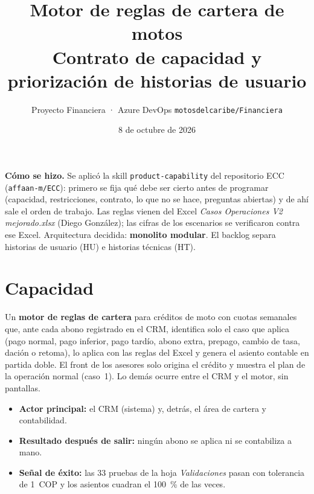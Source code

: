 \documentclass[11pt,a4paper]{article}
\title{\color{primario}\textbf{Motor de reglas de cartera de motos}\\[4pt]
\large Contrato de capacidad y priorización de historias de usuario}
\author{Proyecto Financiera · Azure DevOps \texttt{motosdelcaribe/Financiera}}
\date{8 de octubre de 2026}
\begin{document}
\maketitle
\thispagestyle{fancy}

\begin{tcolorbox}[colback=white,colframe=gris,boxrule=0.3pt,arc=2pt]
\small
\textbf{Cómo se hizo.} Se aplicó la skill \texttt{product-capability} del repositorio ECC
(\texttt{affaan-m/ECC}): primero se fija qué debe ser cierto antes de programar (capacidad,
restricciones, contrato, lo que no se hace, preguntas abiertas) y de ahí sale el orden de trabajo.
Las reglas vienen del Excel \textit{Casos Operaciones V2 mejorado.xlsx} (Diego González);
las cifras de los escenarios se verificaron contra ese Excel.
Arquitectura decidida: \textbf{monolito modular}. El backlog separa historias de usuario (HU)
e historias técnicas (HT).
\end{tcolorbox}

\tableofcontents
\newpage

\section{Capacidad}

Un \textbf{motor de reglas de cartera} para créditos de moto con cuotas semanales que, ante cada
abono registrado en el CRM, identifica solo el caso que aplica (pago normal, pago inferior, pago
tardío, abono extra, prepago, cambio de tasa, dación o retoma), lo aplica con las reglas del Excel
y genera el asiento contable en partida doble. El front de los asesores solo origina el crédito y
muestra el plan de la operación normal (caso~1). Lo demás ocurre entre el CRM y el motor, sin
pantallas.

\begin{itemize}
  \item \textbf{Actor principal:} el CRM (sistema) y, detrás, el área de cartera y contabilidad.
  \item \textbf{Resultado después de salir:} ningún abono se aplica ni se contabiliza a mano.
  \item \textbf{Señal de éxito:} las 33 pruebas de la hoja \textit{Validaciones} pasan con
        tolerancia de 1~COP y los asientos cuadran el 100~\% de las veces.
\end{itemize}

\end{document}
